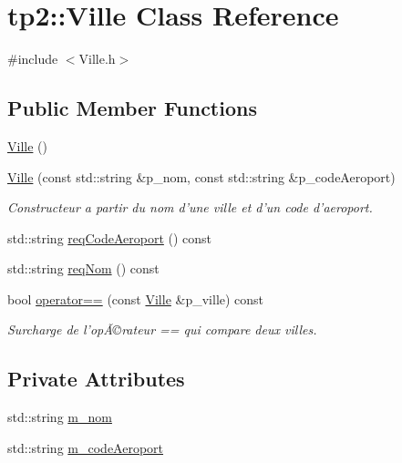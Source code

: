 \hypertarget{classtp2_1_1_ville}{
\section{tp2::Ville Class Reference}
\label{classtp2_1_1_ville}
}


{\ttfamily \#include $<$Ville.h$>$}

\subsection*{Public Member Functions}
\begin{DoxyCompactItemize}
\item 
\hyperlink{classtp2_1_1_ville_ad9514b31741e0c064c952399c0f2d9df}{Ville} ()
\item 
\hyperlink{classtp2_1_1_ville_a5ce647798421e22449c8825eb39e72ae}{Ville} (const std::string \&p\_\-nom, const std::string \&p\_\-codeAeroport)
\begin{DoxyCompactList}\small\item\em Constructeur a partir du nom d'une ville et d'un code d'aeroport. \end{DoxyCompactList}\item 
std::string \hyperlink{classtp2_1_1_ville_a43c4386edae16ad0c2cd67b44aeaf536}{reqCodeAeroport} () const 
\item 
std::string \hyperlink{classtp2_1_1_ville_a7abe57d51aa825269f77f46a8e7d1c14}{reqNom} () const 
\item 
bool \hyperlink{classtp2_1_1_ville_aae02a533b1480dd5302e1a8f66dc7737}{operator==} (const \hyperlink{classtp2_1_1_ville}{Ville} \&p\_\-ville) const 
\begin{DoxyCompactList}\small\item\em Surcharge de l'opÃ©rateur == qui compare deux villes. \end{DoxyCompactList}\end{DoxyCompactItemize}
\subsection*{Private Attributes}
\begin{DoxyCompactItemize}
\item 
std::string \hyperlink{classtp2_1_1_ville_a0d09e7e88fdb306b3fe93f94bbd3f27f}{m\_\-nom}
\item 
std::string \hyperlink{classtp2_1_1_ville_ab0d8cfb732eba3b860385a04e8d6b151}{m\_\-codeAeroport}
\end{DoxyCompactItemize}
